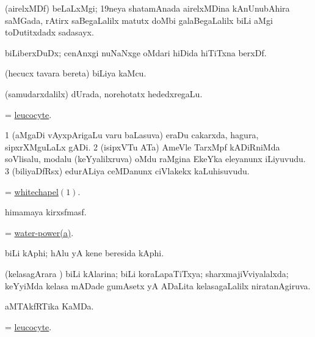 \bentry
{} 
\gl{\nA}
\expl{}
\bmng
(airelxMDf) beLaLxMgi; 19neya shatamAnada airelxMDina kAnUnubAhira saMGada, rAtirx saBegaLalilx matutx doMbi galaBegaLalilx biLi aMgi toDutitxdadx sadasayx. 
\emng
\eentry

\bentry
{} 
\gl{\nA}
\expl{}
\bmng
biLiberxDuDx; cenAnxgi nuNaNxge oMdari hiDida hiTiTxna berxDf. 
\emng
\eentry

\bentry
{} 
\gl{\nA}
\expl{}
\bmng
(hecucx tavara bereta) biLiya kaMcu. 
\emng
\eentry

\bentry
{} 
\gl{\nA}
\expl{}
\bmng
(samudarxdalilx) dUrada, norehotatx hededxregaLu. 
\emng
\eentry

\bentry
{} 
\gl{\nA}
\expl{}
\bmng
= \hyperref{kandict_l.pdf}{L}{leucocyte}{leucocyte}. 
\emng
\eentry

\bentry
{} 
\gl{\nA}
\expl{}
\bmng
\bnum
\num{1} (aMgaDi vAyxpArigaLu \mo varu baLasuva) eraDu cakarxda, hagura, sipxrXMguLaLx gADi. 
\num{2} (isipxVTu ATa) AmeVle TarxMpf kADiRniMda soVlisalu, modalu (keYyalilxruva) oMdu raMgina EkeYka eleyanunx iLiyuvudu. 
\num{3} (biliyaDfRsx) edurALiya ceMDanunx ciVlakekx kaLuhisuvudu. 
\enum
\emng
\eentry

\bentry
{}
\gl{\nA}
\bmng
= \hyperlink{Whitechapel}{whitechapel\((1)\)}. 
\emng
\eentry

\bentry
{}
\gl{\nA}
\bmng
himamaya kirxsfmasf. 
\emng
\eentry

\bentry
{}
\gl{\nA}
\bmng
= \hyperlink{water-power}{water-power(a)}. 
\emng
\eentry

\bentry
{}
\gl{\nA}
\bmng
biLi kAphi; hAlu yA kene beresida kAphi. 
\emng
\eentry

\bentry
{} 
\gl{\gu}
\expl{}
\bmng
(kelasagArara \vi) biLi kAlarina; biLi koraLapaTiTxya; sharxmajiVviyalalxda; keYyiMda kelasa mADade gumAsetx yA ADaLita kelasagaLalilx niratanAgiruva. 
\emng
\eentry

\bentry
{}
\gl{\nA}
\bmng
aMTAkfRTika KaMDa. 
\emng
\eentry

\bentry
{}
\gl{\nA}
\bmng
= \hyperref{kandict_l.pdf}{L}{leucocyte}{leucocyte}. 
\emng
\eentry


